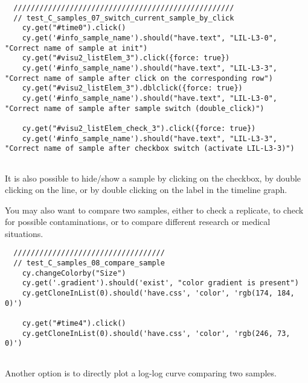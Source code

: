 \begin{verbatim}
  ///////////////////////////////////////////////////
  // test_C_samples_07_switch_current_sample_by_click
    cy.get("#time0").click()
    cy.get('#info_sample_name').should("have.text", "LIL-L3-0", "Correct name of sample at init")
    cy.get("#visu2_listElem_3").click({force: true})
    cy.get('#info_sample_name').should("have.text", "LIL-L3-3", "Correct name of sample after click on the corresponding row")
    cy.get("#visu2_listElem_3").dblclick({force: true})
    cy.get('#info_sample_name').should("have.text", "LIL-L3-0", "Correct name of sample after sample switch (double_click)")

    cy.get("#visu2_listElem_check_3").click({force: true})
    cy.get('#info_sample_name').should("have.text", "LIL-L3-3", "Correct name of sample after checkbox switch (activate LIL-L3-3)")


\end{verbatim}
It is also possible to hide/show a sample by clicking on the checkbox, by
double clicking on the line, or by double clicking on the label in the timeline graph.

\bigskip

You may also want to compare two samples, either to check a replicate, to check for possible contaminations, or to
compare different research or medical situations.

\begin{verbatim}
  ///////////////////////////////////
  // test_C_samples_08_compare_sample
    cy.changeColorby("Size")
    cy.get('.gradient').should('exist', "color gradient is present")
    cy.getCloneInList(0).should('have.css', 'color', 'rgb(174, 184, 0)')

    cy.get("#time4").click()
    cy.getCloneInList(0).should('have.css', 'color', 'rgb(246, 73, 0)')


\end{verbatim}

Another option is to directly plot a log-log curve comparing two samples.

